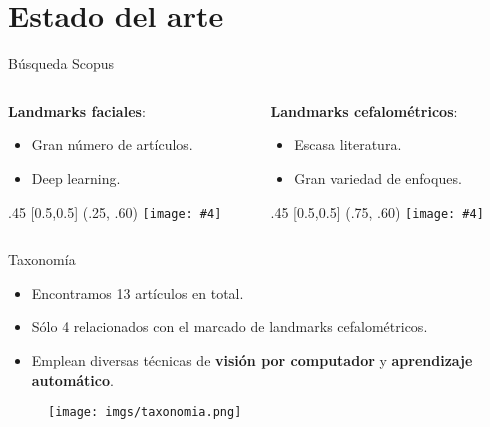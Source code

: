 \documentclass[aspectratio=43]{beamer}
\newcommand{\absimage}[4][0.5,0.5]{%
	\begin{textblock}{#3}%
		[#1]%
		(#2)%
		\texttt{[image: \#4]}%
\end{textblock}}
\begin{document}
\section{Estado del arte}

\begin{frame}[t]{Búsqueda Scopus}

  \begin{columns}[onlytextwidth]
    \begin{column}{.5\textwidth}
      \textbf{Landmarks faciales}:
      \begin{itemize}
        \item Gran número de artículos.
        \item Deep learning.
      \end{itemize} 
      \absimage{.25, .60}{.45}{imgs/Scopus_1.png}
    \end{column}
    \begin{column}{.5\textwidth}
      \textbf{Landmarks cefalométricos}:
      \begin{itemize}
        \item Escasa literatura. \item Gran variedad de enfoques.
      \end{itemize}
      \absimage{.75, .60}{.45}{imgs/Scopus_2.png}
    \end{column}
  \end{columns}
\end{frame}

\begin{frame}[t]{Taxonomía}
  \begin{itemize}
    \item Encontramos 13 artículos en total.
    \item Sólo 4 relacionados con el marcado de landmarks cefalométricos.
    \item Emplean diversas técnicas de \textbf{visión por computador} y \textbf{aprendizaje automático}.
  \end{itemize}
  \begin{figure}
    \centering
    \texttt{[image: imgs/taxonomia.png]}
  \end{figure}
\end{frame}
\end{document}
